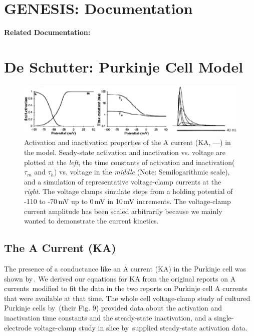 \documentclass[12pt]{article}
\begin{document}
\section*{GENESIS: Documentation}

{\bf Related Documentation:}

\section*{De Schutter: Purkinje Cell Model}

\begin{figure}[h]
\centering
   \includegraphics[scale=0.75]{figures/DS1.2F.eps}
   \caption{Activation and inactivation properties of the A current (KA, ---) in the model. Seady-state activation and inactivation vs. voltage are plotted at the {\em left}, the time constants of activation and inactivation($\tau_m$ and $\tau_h$) vs. voltage in the {\em middle} (Note: Semilogarithmic scale), and a simulation of representative voltage-clamp currents at the {\em right}. The voltage clamps simulate steps from a holding potential of -110 to -70\,mV up to 0\,mV in 10\,mV increments. The voltage-clamp current amplitude has been scaled arbitrarily because we mainly wanted to demonstrate the current kinetics.}
   \label{fig:DS1.2F}
\end{figure}

\subsection*{The A Current (KA)}

The presence of a conductance like an A current (KA) in the Purkinje cell was shown by\,\cite{Hounsgaard:1988nx}. We derived our equations for KA from the original reports on A currents\,\cite{Connor:1971tg, De-Schutter:1986hc} modified to fit the data in the two reports on Purkinje cell A currents that were available at that time. The whole cell voltage-clamp study of cultured Purkinje cells by\,\cite{Hirano:1989uq} (their Fig. 9) provided data about the activation and inactivation time constants and the steady-state inactivation, and a single-electrode voltage-clamp study in slice by\,\cite{Li:1990ij} supplied steady-state activation data.
\end{document}
